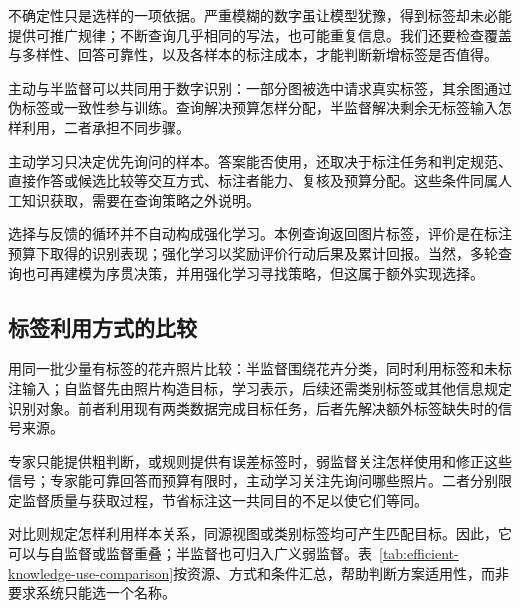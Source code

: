 不确定性只是选样的一项依据。严重模糊的数字虽让模型犹豫，得到标签却未必能提供可推广规律；不断查询几乎相同的写法，也可能重复信息。我们还要检查覆盖与多样性、回答可靠性，以及各样本的标注成本，才能判断新增标签是否值得。

主动与半监督可以共同用于数字识别：一部分图被选中请求真实标签，其余图通过伪标签或一致性参与训练。查询解决预算怎样分配，半监督解决剩余无标签输入怎样利用，二者承担不同步骤。

主动学习只决定优先询问的样本。答案能否使用，还取决于标注任务和判定规范、直接作答或候选比较等交互方式、标注者能力、复核及预算分配。这些条件同属人工知识获取，需要在查询策略之外说明。

选择与反馈的循环并不自动构成强化学习。本例查询返回图片标签，评价是在标注预算下取得的识别表现；强化学习以奖励评价行动后果及累计回报。当然，多轮查询也可再建模为序贯决策，并用强化学习寻找策略，但这属于额外实现选择。

\subsection{标签利用方式的比较}
\label{sec:efficient-knowledge-use-comparison}

用同一批少量有标签的花卉照片比较：半监督围绕花卉分类，同时利用标签和未标注输入；自监督先由照片构造目标，学习表示，后续还需类别标签或其他信息规定识别对象。前者利用现有两类数据完成目标任务，后者先解决额外标签缺失时的信号来源。

专家只能提供粗判断，或规则提供有误差标签时，弱监督关注怎样使用和修正这些信号；专家能可靠回答而预算有限时，主动学习关注先询问哪些照片。二者分别限定监督质量与获取过程，节省标注这一共同目的不足以使它们等同。

对比则规定怎样利用样本关系，同源视图或类别标签均可产生匹配目标。因此，它可以与自监督或监督重叠；半监督也可归入广义弱监督。表~\ref{tab:efficient-knowledge-use-comparison}按资源、方式和条件汇总，帮助判断方案适用性，而非要求系统只能选一个名称。


